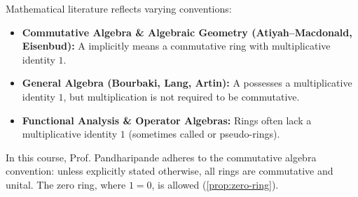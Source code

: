 \begin{content}
\end{content}

\begin{aiNote}
Mathematical literature reflects varying conventions:
\begin{itemize}
    \item \textbf{Commutative Algebra \& Algebraic Geometry (Atiyah--Macdonald, Eisenbud):} A  implicitly means a commutative ring with multiplicative identity $1$.
    \item \textbf{General Algebra (Bourbaki, Lang, Artin):} A  possesses a multiplicative identity $1$, but multiplication is not required to be commutative.
    \item \textbf{Functional Analysis \& Operator Algebras:} Rings often lack a multiplicative identity $1$ (sometimes called  or pseudo-rings).
\end{itemize}
In this course, Prof. Pandharipande adheres to the commutative algebra convention: unless explicitly stated otherwise, all rings are commutative and unital. The zero ring, where $1 = 0$, is allowed (\cref{prop:zero-ring}).
\end{aiNote}

